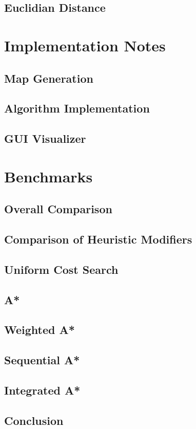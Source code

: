 \documentclass[11pt,draft]{article}
\begin{document}
\subsection{Euclidian Distance}


\section{Implementation Notes}

\subsection{Map Generation}

\subsection{Algorithm Implementation}

\subsection{GUI Visualizer}

\section{Benchmarks}

\subsection{Overall Comparison}
\subsection{Comparison of Heuristic Modifiers}
\subsection{Uniform Cost Search}
\subsection{A*}
\subsection{Weighted A*}
\subsection{Sequential A*}
\subsection{Integrated A*}
\subsection{Conclusion}
\end{document}

